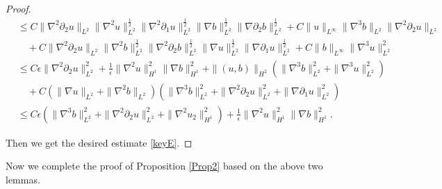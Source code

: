 \documentclass[reqno,11pt]{amsart}
\numberwithin{Thm}{section}
\begin{document}
\begin{proof}
\begin{align*}
&\leq C\|\nabla^2 \partial_2u\|_{L^{2}}\|\nabla^2u\|_{L^{2}}^{\frac{1}{2}}\|\nabla^2\partial_1 u\|_{L^{2}}^{\frac{1}{2}}\|\nabla b\|_{L^{2}}^{\frac{1}{2}}\|\nabla\partial_2 b\|_{L^{2}}^{\frac{1}{2}}+C\|u\|_{L^{\infty}}\|\nabla^3 b\|_{L^{2}}\|\nabla^2\partial_2 u\|_{L^{2}}\nonumber\\
&\quad+C\|\nabla^2 \partial_2u\|_{L^{2}}\|\nabla^2b\|_{L^{2}}^{\frac{1}{2}}\|\nabla^2\partial_2 b\|_{L^{2}}^{\frac{1}{2}}\|\nabla u\|_{L^{2}}^{\frac{1}{2}}\|\nabla\partial_1 u\|_{L^{2}}^{\frac{1}{2}}
+C\|b\|_{L^{\infty}}\|\nabla^3 u\|_{L^{2}}^2\nonumber\\
&\leq C\epsilon\|\nabla^2 \partial_2u\|_{L^{2}}^2+\frac{1}{\epsilon}\|\nabla^2 u\|_{H^{1}}^2\|\nabla b\|_{H^{1}}^2+\|(u,b)\|_{H^{2}}\left(\|\nabla^3 b\|_{L^{2}}^2+\|\nabla^3 u\|_{L^{2}}^2\right)\nonumber\\
&\quad+C(\|\nabla u\|_{L^{2}}+\|\nabla ^2b\|_{L^{2}})\left(\|\nabla^3 b\|_{L^{2}}^2+\|\nabla^2\partial_2 u\|_{L^{2}}^2+\|\nabla\partial_1u\|_{L^{2}}^2\right)
\nonumber\\
&\leq C\epsilon\left(\|\nabla^3b\|_{L^{2}}^2+\|\nabla^2\partial_2 u\|_{L^{2}}^2+\|\nabla^2u_2\|_{H^{1}}^2\right)+\frac{1}{\epsilon}\|\nabla^2 u\|_{H^{1}}^2\|\nabla b\|_{H^{1}}^2.
\end{align*}


Then we get the desired estimate \eqref{keyE}.
 \end{proof}


 Now we complete the proof of   Proposition \ref{Prop2} based on the above two lemmas.
\end{document}
